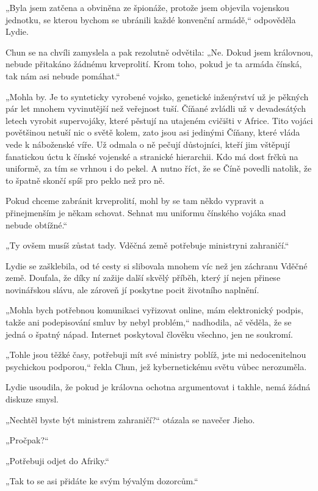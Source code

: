 „Byla jsem zatčena a obviněna ze špionáže, protože jsem objevila vojenskou jednotku, se kterou bychom se ubránili každé konvenční armádě,“ odpověděla Lydie.

Chun se na chvíli zamyslela a pak rezolutně odvětila: „Ne. Dokud jsem královnou, nebude přitakáno žádnému krveprolití. Krom toho, pokud je ta armáda čínská, tak nám asi nebude pomáhat.“

„Mohla by. Je to synteticky vyrobené vojsko, genetické inženýrství už je pěkných pár let mnohem vyvinutější než veřejnost tuší. Číňané zvládli už v devadesátých letech vyrobit supervojáky, které pěstují na utajeném cvičišti v Africe. Tito vojáci povětšinou netuší nic o světě kolem, zato jsou asi jedinými Číňany, které vláda vede k náboženské víře. Už odmala o ně pečují důstojníci, kteří jim vštěpují fanatickou úctu k čínské vojenské a stranické hierarchii. Kdo má dost frčků na uniformě, za tím se vrhnou i do pekel. A nutno říct, že se Číně povedli natolik, že to špatně skončí spíš pro peklo než pro ně.

Pokud chceme zabránit krveprolití, mohl by se tam někdo vypravit a přinejmenším je někam schovat. Sehnat mu uniformu čínského vojáka snad nebude obtížné.“

„Ty ovšem musíš zůstat tady. Vděčná země potřebuje ministryni zahraničí.“

Lydie se zašklebila, od té cesty si slibovala mnohem víc než jen záchranu Vděčné země. Doufala, že díky ní zažije další skvělý příběh, který jí nejen přinese novinářskou slávu, ale zároveň jí poskytne pocit životního naplnění.

„Mohla bych potřebnou komunikaci vyřizovat online, mám elektronický podpis, takže ani podepisování smluv by nebyl problém,“ nadhodila, ač věděla, že se jedná o špatný nápad. Internet poskytoval člověku všechno, jen ne soukromí.

„Tohle jsou těžké časy, potřebuji mít své ministry poblíž, jste mi nedocenitelnou psychickou podporou,“ řekla Chun, jež kybernetickému světu vůbec nerozuměla.

Lydie usoudila, že pokud je královna ochotna argumentovat i takhle, nemá žádná diskuze smysl.
\vspace{0.75cm}

„Nechtěl byste být ministrem zahraničí?“ otázala se navečer Jieho.

„Pročpak?“ 

„Potřebuji odjet do Afriky.“

„Tak to se asi přidáte ke svým bývalým dozorcům.“

